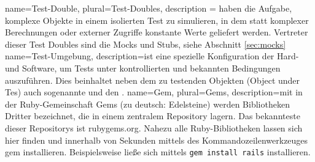 
 {
  name={Test-Double},
  plural={Test-Doubles},
  description = {haben die Aufgabe, komplexe Objekte in einem isolierten Test zu simulieren, in dem statt komplexer Berechnungen oder externer Zugriffe konstante Werte geliefert werden. Vertreter dieser Test Doubles sind die Mocks und Stubs, siehe Abschnitt
 \ref{sec:mocks}}
}
 {
  name={Test-Umgebung},
  description={ist eine spezielle Konfiguration der Hard- und Software, um Tests unter kontrollierten und bekannten Bedingungen auszuführen. Dies beinhaltet neben dem zu testenden Objekten (Object under Tes) auch sogenannte  und den .}
}
 {
  name={Gem},
  plural={Gems},
  description={mit in der Ruby-Gemeinschaft Gems (zu deutsch: Edelsteine) werden Bibliotheken Dritter bezeichnet, die in einem zentralem Repository lagern. Das bekannteste dieser Repositorys ist rubygems.org. Nahezu alle Ruby-Bibliotheken lassen sich hier finden und innerhalb von Sekunden mittels des Kommandozeilenwerkzeuges gem installieren. Beispielsweise ließe sich  mittels \texttt{gem install rails} installieren.}
}
\newcommand{\glossar}[1]{$^\uparrow$\gls{#1}}

\newcommand{\glossarpl}[1]{$^\uparrow$\glspl{#1}}
\glsaddall

\renewcommand{\glossarypreamble}{Im Folgenden werden einige oft-verwendete Begriffe näher erläutert. Innerhalb des Hauptteils dieser Arbeit sind diese Begriffe mit einem $^\uparrow$ gekennzeichnet}

\printglossary[toctitle=Glossar]

